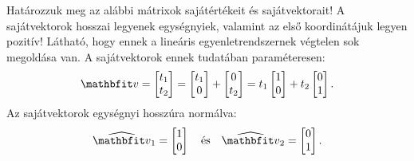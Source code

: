 \begin{exercise}{%
		Határozzuk meg az alábbi mátrixok sajátértékeit és sajátvektorait!
		A sajátvektorok hosszai legyenek egységnyiek, valamint az első koordinátájuk
		legyen pozitív!
	}
{	Látható, hogy ennek a lineáris egyenletrendszernek végtelen sok megoldása van.
	A sajátvektorok ennek tudatában paraméteresen:
	\[
		\rvec v = \begin{bmatrix}
			t_1 \\ t_2
		\end{bmatrix} = \begin{bmatrix}
			t_1 \\ 0
		\end{bmatrix} + \begin{bmatrix}
			0 \\ t_2
		\end{bmatrix} = t_1 \begin{bmatrix}
			1 \\ 0
		\end{bmatrix} + t_2 \begin{bmatrix}
			0 \\ 1
		\end{bmatrix}
		\text{.}
	\]
	Az sajátvektorok egységnyi hosszúra normálva:
	\[
		\uvec v_1 = \begin{bmatrix}
			1 \\ 0
		\end{bmatrix}
		\quad \text{és} \quad
		\uvec v_2 = \begin{bmatrix}
			0 \\ 1
		\end{bmatrix}
		\text{.}
	\]
	}
\end{exercise}
